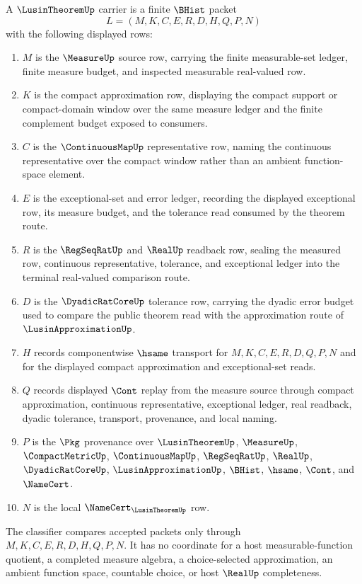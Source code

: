 \begin{definition}\label{def:lusin-theorem-carrier}
A $\LusinTheoremUp$ carrier is a finite $\BHist$ packet
$$
L=(M,K,C,E,R,D,H,Q,P,N)
$$
with the following displayed rows:
\begin{enumerate}
\item $M$ is the $\MeasureUp$ source row, carrying the finite measurable-set ledger, finite measure budget, and inspected measurable real-valued row.
\item $K$ is the compact approximation row, displaying the compact support or compact-domain window over the same measure ledger and the finite complement budget exposed to consumers.
\item $C$ is the $\ContinuousMapUp$ representative row, naming the continuous representative over the compact window rather than an ambient function-space element.
\item $E$ is the exceptional-set and error ledger, recording the displayed exceptional row, its measure budget, and the tolerance read consumed by the theorem route.
\item $R$ is the $\RegSeqRatUp$ and $\RealUp$ readback row, sealing the measured row, continuous representative, tolerance, and exceptional ledger into the terminal real-valued comparison route.
\item $D$ is the $\DyadicRatCoreUp$ tolerance row, carrying the dyadic error budget used to compare the public theorem read with the approximation route of $\LusinApproximationUp$.
\item $H$ records componentwise $\hsame$ transport for $M,K,C,E,R,D,Q,P,N$ and for the displayed compact approximation and exceptional-set reads.
\item $Q$ records displayed $\Cont$ replay from the measure source through compact approximation, continuous representative, exceptional ledger, real readback, dyadic tolerance, transport, provenance, and local naming.
\item $P$ is the $\Pkg$ provenance over $\LusinTheoremUp$, $\MeasureUp$, $\CompactMetricUp$, $\ContinuousMapUp$, $\RegSeqRatUp$, $\RealUp$, $\DyadicRatCoreUp$, $\LusinApproximationUp$, $\BHist$, $\hsame$, $\Cont$, and $\NameCert$.
\item $N$ is the local $\NameCert_{\LusinTheoremUp}$ row.
\end{enumerate}
The classifier compares accepted packets only through $M,K,C,E,R,D,H,Q,P,N$. It has no coordinate for a host measurable-function quotient, a completed measure algebra, a choice-selected approximation, an ambient function space, countable choice, or host $\RealUp$ completeness.
\end{definition}

